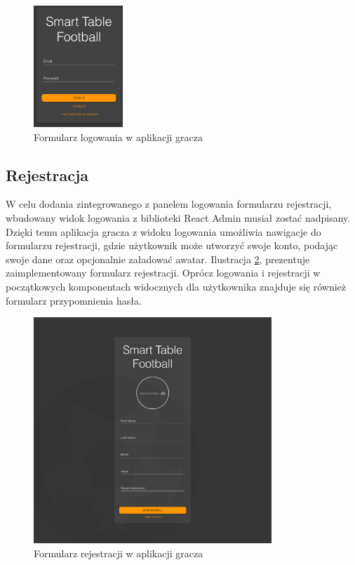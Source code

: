 \begin{figure}[h!]
  \centering
    \includegraphics[width=0.3\textwidth]{images/player/login.png}
  \caption{Formularz logowania w aplikacji gracza}
  \label{fig:player-login}
\end{figure}

\subsection{Rejestracja}

W celu dodania zintegrowanego z panelem logowania formularzu rejestracji, wbudowany widok logowania z biblioteki React Admin musiał zostać nadpisany. Dzięki temu aplikacja gracza z widoku logowania umożliwia nawigacje do formularzu rejestracji, gdzie użytkownik może utworzyć swoje konto, podając swoje dane oraz opcjonalnie załadować awatar. Ilustracja \ref{fig:player-registration}, prezentuje zaimplementowany formularz rejestracji. Oprócz logowania i rejestracji w początkowych komponentach widocznych dla użytkownika znajduje się również formularz przypomnienia hasła.

\begin{figure}[h!]
  \centering
    \includegraphics[width=0.8\textwidth]{images/player/registration.png}
  \caption{Formularz rejestracji w aplikacji gracza}
  \label{fig:player-registration}
\end{figure}

